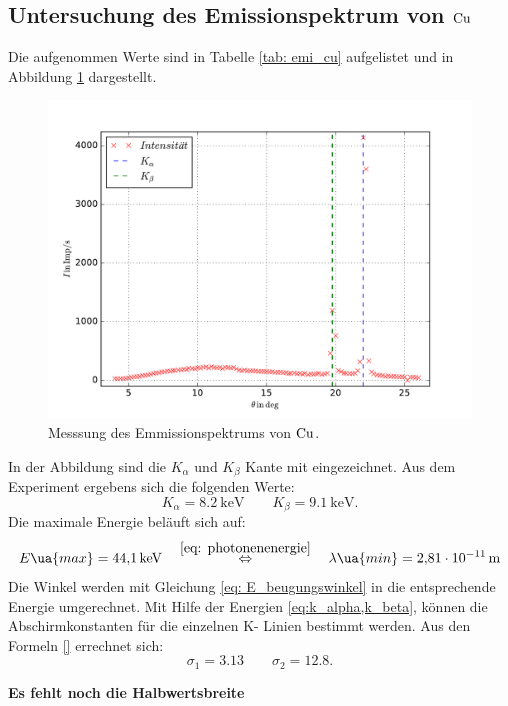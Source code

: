 \subsection{Untersuchung des Emissionspektrum von $\ce{Cu}$}
Die aufgenommen Werte sind in Tabelle \ref{tab: emi_cu} aufgelistet und in Abbildung \ref{fig: emission_cu} dargestellt.

\begin{figure}
  \centering
  \includegraphics[width=0.8 \textwidth]{../Messdaten/emission_cu.pdf}
  \caption{Messsung des Emmissionspektrums von $\ce{Cu}$.} %
  \label{fig: emission_cu}
\end{figure}
In der Abbildung sind die $K_\alpha$ und $K_\beta$ Kante mit eingezeichnet.
Aus dem Experiment ergebens sich die folgenden Werte:
\begin{equation}
  \label{eq:k_alpha,k_beta}
  K_\alpha=\SI{8.2}{\kilo\eV} \qquad   K_\beta=\SI{9.1}{\kilo\eV}.
\end{equation}
Die maximale Energie beläuft sich auf:
\begin{equation}
  \label{eq: maximale_energie}
  E\ua{max}=\SI{44.1}{\kilo\eV} \quad \overset{\eqref{eq: photonenenergie}}{\Leftrightarrow} \quad \lambda\ua{min}=\SI{2.81e-11}{\meter}
\end{equation}
Die Winkel werden mit Gleichung \eqref{eq: E_beugungswinkel} in die entsprechende Energie umgerechnet.
Mit Hilfe der Energien \eqref{eq:k_alpha,k_beta}, können die Abschirmkonstanten
für die einzelnen K- Linien bestimmt werden.
Aus den Formeln \eqref{} errechnet sich:
\begin{equation}
   \label{eq:abschirm}
   \sigma_1=3.13 \qquad \sigma_2=12.8.
\end{equation}

\textbf{Es fehlt noch die Halbwertsbreite}

